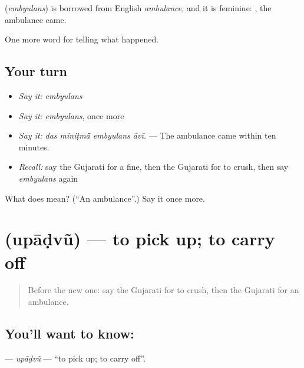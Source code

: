 \begin{cousinweb}
\textbf{} (\emph{embyulans}) is borrowed from English \emph{ambulance}, and it is feminine: \textbf{ }, the ambulance came.
\end{cousinweb}

\begin{grammarlens}[title={What you've built}]
One more word for telling what happened.
\end{grammarlens}

\subsection*{Your turn}
\begin{itemize}
\raggedright
  \item \emph{Say it:} \emph{embyulans}
  \item \emph{Say it:} \emph{embyulans}, once more
  \item \emph{Say it:} \emph{das miniṭmā̃ embyulans āvī.} — The ambulance came within ten minutes.
  \item \emph{Recall:} say the Gujarati for a fine, then the Gujarati for to crush, then say \emph{embyulans} again
\end{itemize}

\begin{tcolorbox}[breakable,colback=teal!4,colframe=teal!35!black,title={Before you move on}]
What does  mean? (\textquotedblleft{}An ambulance\textquotedblright{}.) Say it once more.
\end{tcolorbox}
\section[\texorpdfstring{\gu{ઉપાડવું} (upāḍvũ)}{ઉપાડવું (upāḍvũ)}]{ (upāḍvũ) — to pick up; to carry off}

\label{lesson:GU-C296-upadvu-lift}



\begin{quote}
Before the new one: say the Gujarati for to crush, then the Gujarati for an ambulance.
\end{quote}

\subsection*{You'll want to know: }
\textbf{} — \emph{upāḍvũ} — \textquotedblleft{}to pick up; to carry off\textquotedblright{}.

